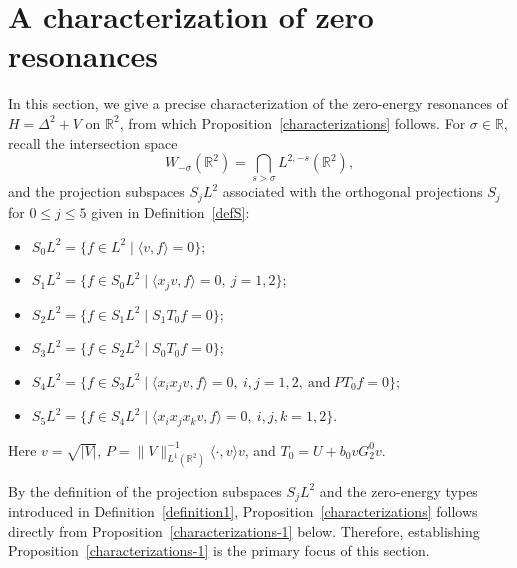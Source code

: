 \documentclass[reqno]{amsart}
\numberwithin{equation}{section}
\begin{document}
\section{A characterization of zero resonances}\label{sec:proof_characterization}
In this section, we give a precise characterization of the zero-energy resonances of $H = \Delta^2 + V$ on $\mathbb{R}^2$, from which Proposition~\ref{characterizations} follows.
For $\sigma \in \mathbb{R}$, recall the intersection space
\[
W_{-\sigma}(\mathbb{R}^2) = \bigcap_{s>\sigma} L^{2,-s}(\mathbb{R}^2),
\]
and the projection subspaces $S_jL^2$ associated with the orthogonal projections $S_j$ for $0 \le j \le 5$ given in Definition~\ref{defS}:
\begin{itemize}
	\item $S_0L^2 = \{ f \in L^2 \mid \langle v, f \rangle = 0\}$;
	\item $S_1L^2 = \{ f \in S_0L^2 \mid \langle x_j v, f \rangle = 0,\ j = 1,2 \}$;
	\item $S_2L^2 = \{ f \in S_1L^2 \mid S_1T_0f = 0 \}$;
	\item $S_3L^2 = \{ f \in S_2L^2 \mid S_0T_0f = 0 \}$;
	\item $S_4L^2 = \{ f \in S_3L^2 \mid \langle x_ix_j v, f \rangle = 0,\ i,j = 1,2,\ \text{and}\ PT_0f = 0 \}$;
	\item $S_5L^2 = \{ f \in S_4L^2 \mid \langle x_ix_jx_k v, f \rangle = 0,\ i,j,k = 1,2 \}$.
\end{itemize}
Here $v = \sqrt{|V|}$, $P = \|V\|_{L^1(\mathbb{R}^2)}^{-1} \langle \cdot, v\rangle v$, and $T_0 = U + b_0 vG_2^0v$.

By the definition of the projection subspaces $S_jL^2$ and the zero-energy types introduced in Definition~\ref{definition1}, Proposition~\ref{characterizations} follows directly from Proposition~\ref{characterizations-1} below. Therefore, establishing Proposition~\ref{characterizations-1} is the primary focus of this section.
\end{document}
